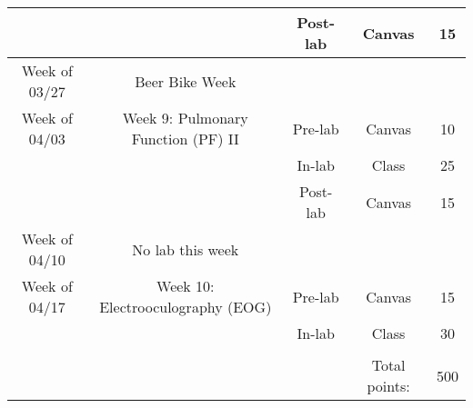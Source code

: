 \documentclass{article}
\begin{document}
\begin{table}[h!]
\begin{tabular}[h!]{ccccc}
		& & Post-lab & Canvas & 15\\
	\midrule
	Week of 03/27 & Beer Bike Week & & \\
	\midrule
	Week of 04/03 & Week 9: Pulmonary Function (PF) II & Pre-lab & Canvas & 10\\
		& & In-lab & Class & 25\\
		& & Post-lab & Canvas & 15\\
	\midrule
	Week of 04/10 & No lab this week & &\\
	\midrule
	Week of 04/17 & Week 10: Electrooculography (EOG) & Pre-lab & Canvas & 15\\
		& & In-lab & Class & 30\\
	\bottomrule
	\\
	& & & Total points: & 500\\
\end{tabular}
\end{table}
\end{document}
